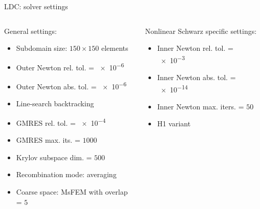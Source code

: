 \begin{frame}[noframenumbering]{LDC: solver settings}
	\begin{columns}
		\begin{column}{0.55\textwidth}
			General settings:
			\vspace{7pt}
			\begin{itemize}
				\item Subdomain size: $150\times 150$ elements
				\item Outer Newton rel. tol.  = \num{e-6}
				\item Outer Newton abs. tol.  = \num{e-6}
        \item Line-search backtracking
				\item GMRES rel. tol. = \num{e-4}
				\item GMRES max. its. = $1000$
				\item Krylov subspace dim. = $500$
				\item Recombination mode: averaging
				\item Coarse space: MsFEM with overlap = $5$
			\end{itemize}
		\end{column}%
		\begin{column}{0.45\textwidth}
			Nonlinear Schwarz specific settings:
			\vspace{7pt}
			\begin{itemize}
				\item Inner Newton rel. tol. = \num{e-3}
				\item Inner Newton abs. tol. = \num{e-14}
				\item Inner Newton max. iters. = $50$
				\item H1 variant
			\end{itemize}
		\end{column}
	\end{columns}
\end{frame}



